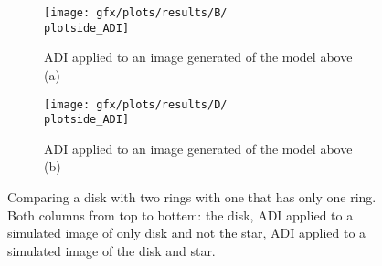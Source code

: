 \begin{figure}[h!]
{\begin{minipage}[t]{1.2\textwidth}
      \begin{subfigure}[t]{0.6\textwidth}
        \texttt{[image: gfx/plots/results/B/\\plotside\_ADI]}
        \caption{\ac{ADI} applied to an image generated of the model above (a)}
        \label{fig:disk0_3}
      \end{subfigure}%
      \begin{subfigure}[t]{0.6\textwidth}
        \texttt{[image: gfx/plots/results/D/\\plotside\_ADI]}
        \caption{\ac{ADI} applied to an image generated of the model above (b)}
        \label{fig:disk1_3}
      \end{subfigure}
  \end{minipage}
  }%

  \caption{Comparing a disk with two rings with one that has only one ring. Both columns from top to bottem: the disk, \ac{ADI} applied to a simulated image of only disk and not the star, \ac{ADI} applied to a simulated image of the disk and star.}
  \label{fig:comp_numb_rings}
\end{figure}

